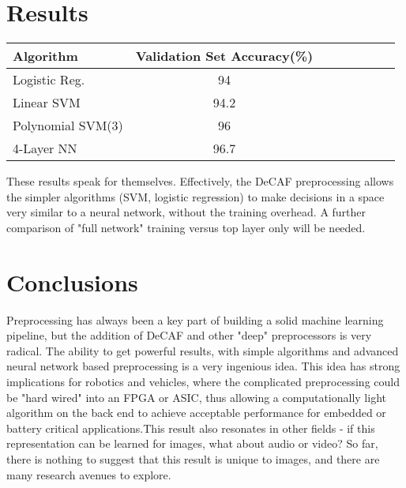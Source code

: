 \documentclass[journal]{IEEEtran}
\begin{document}
\section{Results}
\begin{tabular}{l*{6}{c}r}
    Algorithm         & Validation Set Accuracy(\%) \\
    \hline
    Logistic Reg.     & 94   \\
    Linear SVM        & 94.2 \\
    Polynomial SVM(3) & 96   \\
    4-Layer NN        & 96.7 \\
\end{tabular}

These results speak for themselves. Effectively, the DeCAF preprocessing allows
the simpler algorithms (SVM, logistic regression) to make decisions in a space
very similar to a neural network, without the training overhead. A further
comparison of "full network" training versus top layer only will be needed.

\section{Conclusions}
Preprocessing has always been a key part of building a solid machine learning 
pipeline, but the addition of DeCAF and other "deep" preprocessors is very
radical. The ability to get powerful results, with simple algorithms and 
advanced neural network based preprocessing is a very ingenious idea.
This idea has strong implications for robotics and vehicles, where the
complicated preprocessing could be "hard wired" into an FPGA or ASIC, 
thus allowing a computationally light algorithm on the back end to achieve
acceptable performance for embedded or battery critical applications.This 
result also resonates in other fields - if this representation can be 
learned for images, what about audio or video? So far, there is nothing to
suggest that this result is unique to images, and there are many research
avenues to explore.
\end{document}
